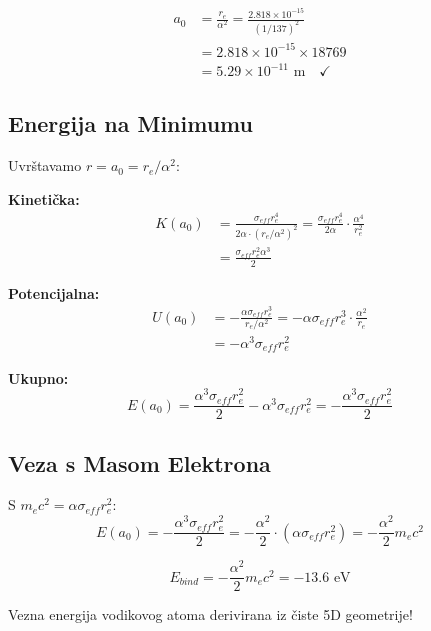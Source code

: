 \documentclass[12pt,a4paper]{article}
\begin{document}
\begin{numerical}
\begin{align*}
a_0 &= \frac{r_e}{\alpha^2} = \frac{2.818 \times 10^{-15}}{(1/137)^2} \\
&= 2.818 \times 10^{-15} \times 18769 \\
&= 5.29 \times 10^{-11} \text{ m} \quad \checkmark
\end{align*}
\end{numerical}

\subsection{Energija na Minimumu}

Uvrštavamo $r = a_0 = r_e/\alpha^2$:

\textbf{Kinetička:}
\begin{align}
K(a_0) &= \frac{\sigma_{eff} r_e^4}{2\alpha \cdot (r_e/\alpha^2)^2} = \frac{\sigma_{eff} r_e^4}{2\alpha} \cdot \frac{\alpha^4}{r_e^2} \\
&= \frac{\sigma_{eff} r_e^2 \alpha^3}{2}
\end{align}

\textbf{Potencijalna:}
\begin{align}
U(a_0) &= -\frac{\alpha \sigma_{eff} r_e^3}{r_e/\alpha^2} = -\alpha \sigma_{eff} r_e^3 \cdot \frac{\alpha^2}{r_e} \\
&= -\alpha^3 \sigma_{eff} r_e^2
\end{align}

\textbf{Ukupno:}
\begin{equation}
E(a_0) = \frac{\alpha^3 \sigma_{eff} r_e^2}{2} - \alpha^3 \sigma_{eff} r_e^2 = -\frac{\alpha^3 \sigma_{eff} r_e^2}{2}
\end{equation}

\subsection{Veza s Masom Elektrona}

S $m_e c^2 = \alpha \sigma_{eff} r_e^2$:
\begin{equation}
E(a_0) = -\frac{\alpha^3 \sigma_{eff} r_e^2}{2} = -\frac{\alpha^2}{2} \cdot (\alpha \sigma_{eff} r_e^2) = -\frac{\alpha^2}{2} m_e c^2
\end{equation}

\begin{keyresult}
\begin{equation}
\boxed{E_{bind} = -\frac{\alpha^2}{2} m_e c^2 = -13.6 \text{ eV}}
\end{equation}

Vezna energija vodikovog atoma derivirana iz čiste 5D geometrije!
\end{keyresult}
\end{document}
